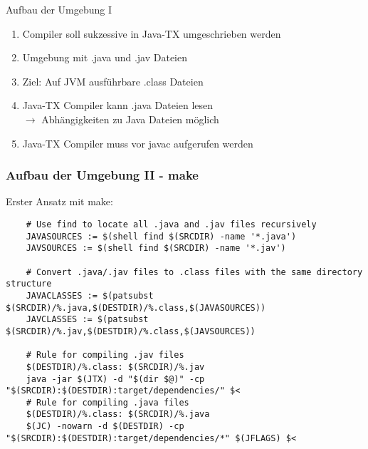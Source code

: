 \documentclass{beamer}
\begin{document}
\begin{frame}{Aufbau der Umgebung I}
        \begin{enumerate}
        \item Compiler soll sukzessive in Java-TX umgeschrieben werden
        \item Umgebung mit .java und .jav Dateien
        \item Ziel: Auf JVM ausführbare .class Dateien
        \item Java-TX Compiler kann .java Dateien lesen \\
        \(\rightarrow\) Abhängigkeiten zu Java Dateien möglich
        \item Java-TX Compiler muss vor javac aufgerufen werden
    \end{enumerate}
\end{frame}

\begin{frame}[fragile]
    \frametitle{Aufbau der Umgebung II - make}
    Erster Ansatz mit make:
    \begin{lstlisting}
    # Use find to locate all .java and .jav files recursively
    JAVASOURCES := $(shell find $(SRCDIR) -name '*.java')
    JAVSOURCES := $(shell find $(SRCDIR) -name '*.jav')

    # Convert .java/.jav files to .class files with the same directory structure
    JAVACLASSES := $(patsubst $(SRCDIR)/%.java,$(DESTDIR)/%.class,$(JAVASOURCES))
    JAVCLASSES := $(patsubst $(SRCDIR)/%.jav,$(DESTDIR)/%.class,$(JAVSOURCES))

    # Rule for compiling .jav files
    $(DESTDIR)/%.class: $(SRCDIR)/%.jav
    java -jar $(JTX) -d "$(dir $@)" -cp "$(SRCDIR):$(DESTDIR):target/dependencies/" $<
    # Rule for compiling .java files
    $(DESTDIR)/%.class: $(SRCDIR)/%.java
	$(JC) -nowarn -d $(DESTDIR) -cp "$(SRCDIR):$(DESTDIR):target/dependencies/*" $(JFLAGS) $<
\end{lstlisting}
\end{frame}
\end{document}
